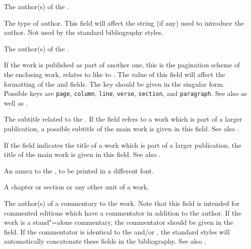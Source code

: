 \documentclass{ltxdockit}[2011/03/25]
\begin{document}
\begin{fieldlist}
The author(s) of the .


The type of author. This field will affect the string (if any) used to introduce the author. Not used by the standard bibliography styles.


The author(s) of the .


If the work is published as part of another one, this is the pagination scheme of the enclosing work, \ie {} relates to  like  to . The value of this field will affect the formatting of the  and  fields. The key should be given in the singular form. Possible keys are \texttt{page}, \texttt{column}, \texttt{line}, \texttt{verse}, \texttt{section}, and \texttt{paragraph}. See also  as well as .


The subtitle related to the . If the  field refers to a work which is part of a larger publication, a possible subtitle of the main work is given in this field. See also .


If the  field indicates the title of a work which is part of a larger publication, the title of the main work is given in this field. See also .


An annex to the , to be printed in a different font.


A chapter or section or any other unit of a work.


The author(s) of a commentary to the work. Note that this field is intended for commented editions which have a commentator in addition to the author. If the work is a stand"=alone commentary, the commentator should be given in the  field. If the commentator is identical to the  and\slash or , the standard styles will automatically concatenate these fields in the bibliography. See also .


\end{fieldlist}
\end{document}
